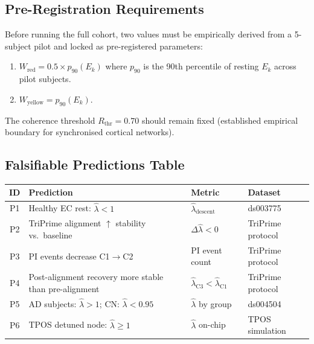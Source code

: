 \documentclass[12pt,a4paper]{article}
\theoremstyle{plain}
\theoremstyle{definition}
\newcommand{\hatlambda}{\hat{\lambda}}
\begin{document}
\subsection{Pre-Registration Requirements}
\label{sec:validation:prereg}

Before running the full cohort, two values must be empirically derived from a 5-subject
pilot and locked as pre-registered parameters:

\begin{enumerate}[label=\textbf{R\arabic*.}]
  \item $W_{\mathrm{red}} = 0.5 \times p_{90}(E_k)$ where $p_{90}$ is the 90th percentile of
        resting $E_k$ across pilot subjects.
  \item $W_{\mathrm{yellow}} = p_{90}(E_k)$.
\end{enumerate}

\noindent The coherence threshold $R_{\mathrm{thr}} = 0.70$ should remain fixed (established
empirical boundary for synchronised cortical networks).

\subsection{Falsifiable Predictions Table}
\label{sec:validation:preds}

\begin{center}
\renewcommand{\arraystretch}{1.4}
\begin{tabular}{@{}clll@{}}
  \toprule
  \textbf{ID} & \textbf{Prediction} & \textbf{Metric} & \textbf{Dataset} \\
  \midrule
  P1 & Healthy EC rest: $\hatlambda < 1$ & $\hatlambda_{\mathrm{descent}}$ & ds003775 \\
  P2 & TriPrime alignment $\uparrow$ stability vs.\ baseline & $\Delta\hatlambda < 0$ & TriPrime protocol \\
  P3 & PI events decrease C1$\to$C2 & PI event count & TriPrime protocol \\
  P4 & Post-alignment recovery more stable than pre-alignment & $\hatlambda_{\mathrm{C3}} < \hatlambda_{\mathrm{C1}}$ & TriPrime protocol \\
  P5 & AD subjects: $\hatlambda > 1$; CN: $\hatlambda < 0.95$ & $\hatlambda$ by group & ds004504 \\
  P6 & TPOS detuned node: $\hatlambda \geq 1$ & $\hatlambda$ on-chip & TPOS simulation \\
  \bottomrule
\end{tabular}
\end{center}
\end{document}
